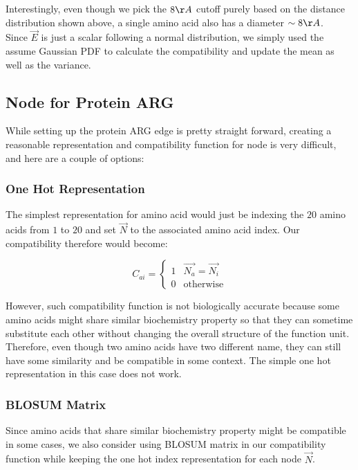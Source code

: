 Interestingly, even though we pick the $8\AA$ cutoff purely based on the distance distribution shown above, a single amino acid also has a diameter $\sim8\AA$.\\

Since $\overrightarrow{E}$ is just a scalar following a normal distribution, we simply used the assume Gaussian PDF to calculate the compatibility and update the mean as well as the variance.

\subsection{Node for Protein ARG}

While setting up the protein ARG edge is pretty straight forward, creating a reasonable representation and compatibility function for node is very difficult, and here are a couple of options:

\subsubsection{One Hot Representation}
 
The simplest representation for amino acid would just be indexing the $20$ amino acids from $1$ to $20$ and set $\overrightarrow{N}$ to the associated amino acid index. Our compatibility therefore would become:
 
 \begin{equation} 
C_{ai}=\begin{cases}1 & \overrightarrow{N_a}=\overrightarrow{N_i}\\0 & \text{otherwise}\end{cases}
\end{equation}

However, such compatibility function is not biologically accurate because some amino acids might share similar biochemistry property so that they can sometime substitute each other without changing the overall structure of the function unit. Therefore, even though two amino acids have two different name, they can still have some similarity and be compatible in some context. The simple one hot representation in this case does not work.

\subsubsection{BLOSUM Matrix}

Since amino acids that share similar biochemistry property might be compatible in some cases, we also consider using BLOSUM matrix in our compatibility function while keeping the one hot index representation for each node $\overrightarrow{N}$.\\

